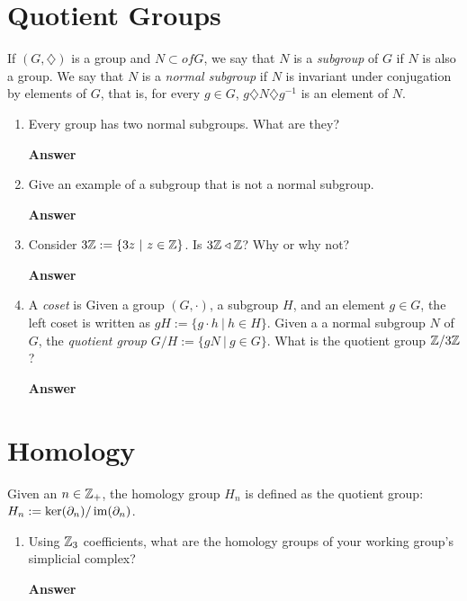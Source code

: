 \documentclass{article}
\begin{document}
\pagebreak
\section*{Quotient Groups}

If $(G,\diamondsuit)$ is a group and $N \subset of G$, we say that $N$ is a
\emph{subgroup} of $G$ if $N$ is also a group.  We say that $N$ is a
\emph{normal subgroup} if $N$ is invariant under conjugation by elements of $G$,
that is, for every $g \in G$, $g \diamondsuit N \diamondsuit g^{-1}$ is an
element of $N$.


\begin{enumerate}
    \item Every group has two normal subgroups.  What are they?

        \textbf{Answer}
        \vspace{2in}


    \item Give an example of a subgroup that is not a normal subgroup.

        \textbf{Answer}
        \vspace{2in}


    \pagebreak
    \item Consider $3{\mathbb Z} := \{3z ~|~ z \in {\mathbb Z}\}$.  Is $3{\mathbb Z} \triangleleft {\mathbb Z}$? Why
        or why not?

        \textbf{Answer}
        \vspace{3in}


    \item A \emph{coset} is Given a group $(G,\cdot)$, a subgroup $H$, and an element $g \in
        G$, the left coset is written as $gH:= \{g \cdot h ~|~ h \in H\}$. Given a
        a normal subgroup $N$ of $G$, the \emph{quotient group} $G/H := \{gN ~|~
        g \in G\}$. What is the quotient group ${\mathbb Z} / 3{\mathbb Z}$?

        \textbf{Answer}
        \vspace{2in}



\end{enumerate}

\pagebreak
\section*{Homology}

Given an $n \in {\mathbb Z}_+$, the homology group $H_n$ is defined as the quotient
group: $H_n := \ker(\partial_n)/\operatorname{im}(\partial_n)$.

\begin{enumerate}
    \item Using ${\mathbb Z}_3$ coefficients, what are the homology groups of your
        working group's simplicial complex?

        \textbf{Answer}
        \vspace{2in}


\end{enumerate}
\end{document}
